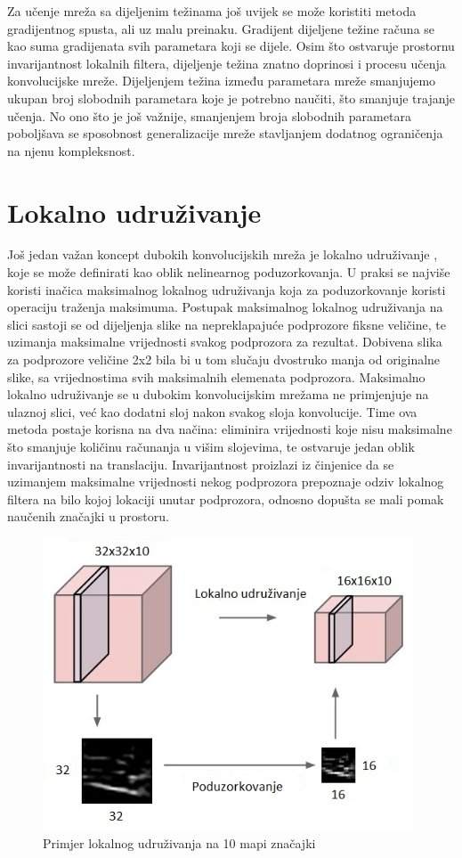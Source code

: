 \documentclass[lmodern, utf8, diplomski, numeric]{fer}
\begin{document}
Za učenje mreža sa dijeljenim težinama još uvijek se može koristiti metoda gradijentnog spusta, ali uz malu preinaku. Gradijent dijeljene težine računa se kao suma gradijenata svih parametara koji se dijele. 
Osim što ostvaruje prostornu invarijantnost lokalnih filtera, dijeljenje težina znatno doprinosi i procesu učenja konvolucijske mreže. Dijeljenjem težina između parametara  mreže smanjujemo ukupan broj slobodnih parametara koje je potrebno naučiti, što smanjuje trajanje učenja. No ono što je još važnije, smanjenjem broja slobodnih parametara poboljšava se sposobnost generalizacije mreže stavljanjem dodatnog ograničenja na njenu kompleksnost.  

\section{Lokalno udruživanje}

Još jedan važan koncept dubokih konvolucijskih mreža je lokalno udruživanje , koje se može definirati kao oblik nelinearnog poduzorkovanja. U praksi se najviše koristi inačica maksimalnog lokalnog udruživanja  koja za poduzorkovanje koristi operaciju traženja maksimuma. 
Postupak maksimalnog lokalnog udruživanja na slici sastoji se od dijeljenja slike na nepreklapajuće podprozore fiksne veličine, te uzimanja maksimalne vrijednosti svakog podprozora za rezultat. Dobivena slika za podprozore veličine 2x2 bila bi u tom slučaju dvostruko manja od originalne slike, sa vrijednostima svih maksimalnih elemenata podprozora. 
Maksimalno lokalno udruživanje se u dubokim konvolucijskim mrežama ne primjenjuje na ulaznoj slici, već kao dodatni sloj nakon svakog sloja konvolucije. Time ova metoda postaje korisna na dva načina: eliminira vrijednosti koje nisu maksimalne što smanjuje količinu računanja u višim slojevima, te ostvaruje jedan oblik invarijantnosti na translaciju. Invarijantnost proizlazi iz činjenice da se uzimanjem maksimalne vrijednosti nekog podprozora prepoznaje odziv lokalnog filtera na bilo kojoj lokaciji unutar podprozora, odnosno dopušta se mali pomak naučenih značajki u prostoru.


\begin{figure}[ht!]
\centering
\includegraphics[width=11cm]{slike/max_pooling.jpeg}
\caption{Primjer lokalnog udruživanja na 10 mapi značajki}
\end{figure}
\end{document}
